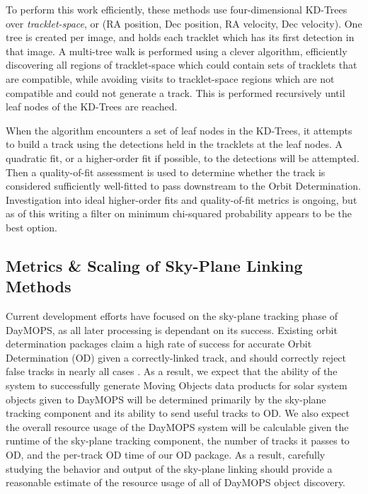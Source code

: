 \documentclass[12pt,preprint]{aastex}
\begin{document}
To perform this work efficiently, these methods use four-dimensional
KD-Trees over \textit{tracklet-space}, or (RA position, Dec position,
RA velocity, Dec velocity). One tree is created per image, and holds
each tracklet which has its first detection in that image.  A
multi-tree walk is performed using a clever algorithm, efficiently
discovering all regions of tracklet-space which could contain sets of
tracklets that are compatible, while avoiding visits to tracklet-space
regions which are not compatible and could not generate a track.  This
is performed recursively until leaf nodes of the KD-Trees are reached.


When the algorithm encounters a set of leaf nodes in the KD-Trees, it
attempts to build a track using the detections held in the tracklets
at the leaf nodes.  A quadratic fit, or a higher-order fit if
possible, to the detections will be attempted.  Then a quality-of-fit
assessment is used to determine whether the track is considered
sufficiently well-fitted to pass downstream to the Orbit
Determination.  Investigation into ideal higher-order fits and
quality-of-fit metrics is ongoing, but as of this writing a filter on
minimum chi-squared probability appears to be the best option.




\subsection{Metrics \& Scaling of Sky-Plane Linking Methods}

Current development efforts have focused on the sky-plane tracking
phase of DayMOPS, as all later processing is dependant on its
success. Existing orbit determination packages claim a high rate of
success for accurate Orbit Determination (OD) given a correctly-linked
track, and should correctly reject false tracks in nearly all cases
\citep{Milani2006}. As a result, we expect that the ability of the
system to successfully generate Moving Objects data products for solar
system objects given to DayMOPS will be determined primarily by the
sky-plane tracking component and its ability to send useful tracks to
OD.  We also expect the overall resource usage of the DayMOPS system
will be calculable given the runtime of the sky-plane tracking
component, the number of tracks it passes to OD, and the per-track OD
time of our OD package.  As a result, carefully studying the behavior
and output of the sky-plane linking should provide a reasonable
estimate of the resource usage of all of DayMOPS object discovery.
\end{document}
